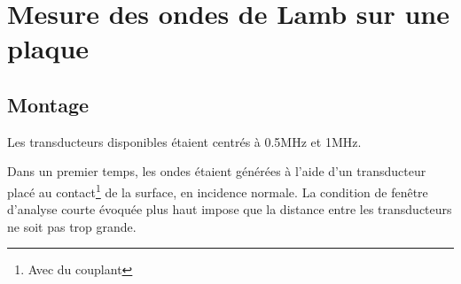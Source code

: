 \section{Mesure des ondes de Lamb sur une plaque}
\subsection{Montage}

Les transducteurs disponibles étaient centrés à 0.5MHz et 1MHz.

Dans un premier temps, les ondes étaient générées à l'aide d'un transducteur placé au contact\footnote{Avec du couplant} de la surface, en incidence normale.
La condition de fenêtre d'analyse courte évoquée plus haut impose que la distance entre les transducteurs ne soit pas trop grande.

